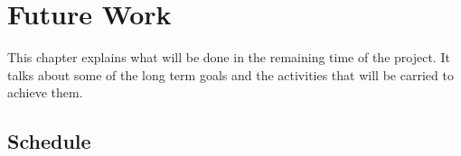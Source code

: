 
\chapter{Future Work}
\label{sec:future_work}

This chapter explains what will be done in the remaining time of the project. It talks about some of the long term goals and the activities that will be carried to achieve them.

\section{Schedule}
\label{sec:schedule}





